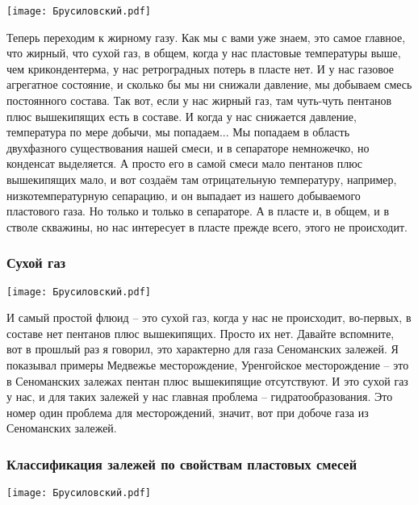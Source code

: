 \documentclass[main.tex]{subfiles}
\begin{document}
\begin{center}
\texttt{[image: Брусиловский.pdf]}
\end{center}

Теперь переходим к жирному газу.
Как мы с вами уже знаем, это самое главное, что жирный, что сухой газ, в общем, когда у нас пластовые температуры выше, чем крикондентерма, у нас ретроградных потерь в пласте нет.
И у нас газовое агрегатное состояние, и сколько бы мы ни снижали давление, мы добываем смесь постоянного состава.
Так вот, если у нас жирный газ, там чуть-чуть пентанов плюс вышекипящих есть в составе.
И когда у нас снижается давление, температура по мере добычи, мы попадаем...
Мы попадаем в область двухфазного существования нашей смеси, и в сепараторе немножечко, но конденсат выделяется.
А просто его в самой смеси мало пентанов плюс вышекипящих мало, и вот создаём там отрицательную температуру, например, низкотемпературную сепарацию, и он выпадает из нашего добываемого пластового газа.
Но только и только в сепараторе.
А в пласте и, в общем, и в стволе скважины, но нас интересует в пласте прежде всего, этого не происходит.

\subsubsection{Сухой газ}

\begin{center}
\texttt{[image: Брусиловский.pdf]}
\end{center}

И самый простой флюид -- это сухой газ, когда у нас не происходит, во-первых, в составе нет пентанов плюс вышекипящих.
Просто их нет.
Давайте вспомните, вот в прошлый раз я говорил, это характерно для газа Сеноманских залежей.
Я показывал примеры Медвежье месторождение, Уренгойское месторождение -- это в Сеноманских залежах пентан плюс вышекипящие отсутствуют.
И это сухой газ у нас, и для таких залежей у нас главная проблема -- гидратообразования.
Это номер один проблема для месторождений, значит, вот при добоче газа из Сеноманских залежей.

\subsubsection{Классификация залежей по свойствам пластовых смесей}

\begin{center}
\texttt{[image: Брусиловский.pdf]}
\end{center}
\end{document}
